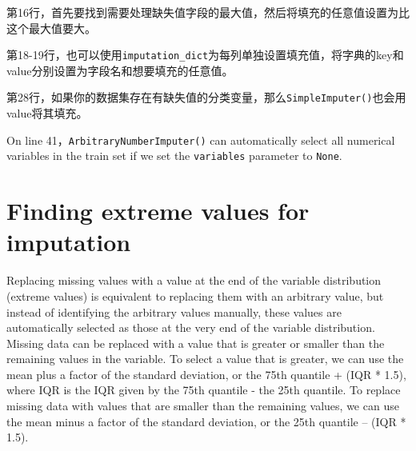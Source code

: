 第16行，首先要找到需要处理缺失值字段的最大值，然后将填充的任意值设置为比这个最大值要大。

第18-19行，也可以使用\verb|imputation_dict|为每列单独设置填充值，将字典的key和value分别设置为字段名和想要填充的任意值。

第28行，如果你的数据集存在有缺失值的分类变量，那么\verb|SimpleImputer()|也会用value将其填充。

On line 41，\verb|ArbitraryNumberImputer()| can automatically select all numerical variables in the
train set if we set the \verb|variables| parameter to \verb|None|.

\section{Finding extreme values for imputation}
Replacing missing values with a value at the end of the variable distribution (extreme values) is
equivalent to replacing them with an arbitrary value, but instead of identifying the arbitrary values
manually, these values are automatically selected as those at the very end of the variable distribution.
Missing data can be replaced with a value that is greater or smaller than the remaining values in the
variable. To select a value that is greater, we can use the mean plus a factor of the standard deviation,
or the 75th quantile + (IQR * 1.5), where IQR is the IQR given by the 75th quantile - the 25th quantile.
To replace missing data with values that are smaller than the remaining values, we can use the mean
minus a factor of the standard deviation, or the 25th quantile – (IQR * 1.5).


